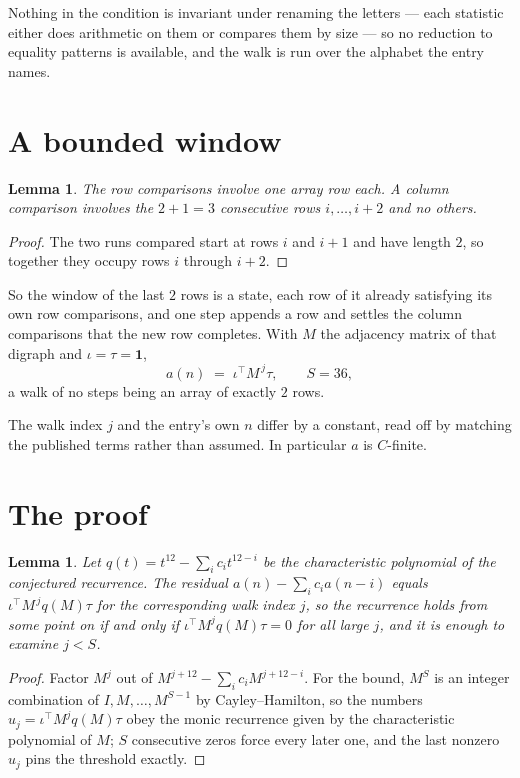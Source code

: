\documentclass[11pt,a4paper]{article}
\theoremstyle{plain}
\newtheorem{lemma}[theorem]{Lemma}
\theoremstyle{definition}
\begin{document}
Nothing in the condition is invariant under renaming the letters --- each statistic either does
arithmetic on them or compares them by size --- so no reduction to equality patterns is
available, and the walk is run over the alphabet the entry names.

\section{A bounded window}

\begin{lemma}\label{lem:win}
The row comparisons involve one array row each. A column comparison involves the
$2+1=3$ consecutive rows $i,\dots,i{+}2$ and no others.
\end{lemma}

\begin{proof}
The two runs compared start at rows $i$ and $i+1$ and have length $2$, so together they
occupy rows $i$ through $i+2$.
\end{proof}

So the window of the last $2$ rows is a state, each row of it already satisfying its own row
comparisons, and one step appends a row and settles the column comparisons that the new row
completes. With $M$ the adjacency matrix of that digraph and $\iota=\tau=\mathbf{1}$,
\[
a(n)\;=\;\iota^{\!\top}M^{\,j}\tau ,\qquad S=36,
\]
a walk of no steps being an array of exactly $2$ rows.

The walk index $j$ and the entry's own $n$ differ by a constant, read off by matching the
published terms rather than assumed. In particular $a$ is $C$-finite.

\section{The proof}

\begin{lemma}\label{lem:crit}
Let $q(t)=t^{12}-\sum_i c_it^{12-i}$ be the characteristic polynomial of the
conjectured recurrence. The residual $a(n)-\sum_ic_ia(n-i)$ equals
$\iota^{\!\top}M^{\,j}q(M)\tau$ for the corresponding walk index $j$, so the recurrence
holds from some point on if and only if $\iota^{\!\top}M^{j}q(M)\tau=0$ for all large $j$,
and it is enough to examine $j<S$.
\end{lemma}

\begin{proof}
Factor $M^{j}$ out of $M^{j+12}-\sum_ic_iM^{j+12-i}$. For the bound, $M^{S}$
is an integer combination of $I,M,\dots,M^{S-1}$ by Cayley--Hamilton, so the numbers
$u_j=\iota^{\!\top}M^{j}q(M)\tau$ obey the monic recurrence given by the characteristic
polynomial of $M$; $S$ consecutive zeros force every later one, and the last nonzero $u_j$
pins the threshold exactly.
\end{proof}
\end{document}
